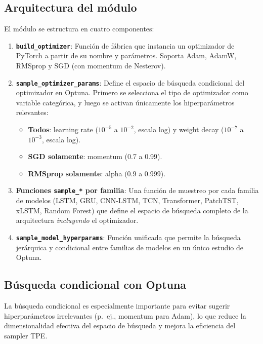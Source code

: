 \documentclass[12pt, a4paper]{article}
\newcommand{\code}[1]{\texttt{#1}}
\begin{document}
\subsection{Arquitectura del módulo}

El módulo se estructura en cuatro componentes:

\begin{enumerate}
    \item \textbf{\code{build\_optimizer}}: Función de fábrica que instancia un optimizador de PyTorch a partir de su nombre y parámetros. Soporta Adam, AdamW, RMSprop y SGD (con momentum de Nesterov).

    \item \textbf{\code{sample\_optimizer\_params}}: Define el espacio de búsqueda condicional del optimizador en Optuna. Primero se selecciona el tipo de optimizador como variable categórica, y luego se activan únicamente los hiperparámetros relevantes:
    \begin{itemize}
        \item \textbf{Todos}: learning rate ($10^{-5}$ a $10^{-2}$, escala log) y weight decay ($10^{-7}$ a $10^{-3}$, escala log).
        \item \textbf{SGD solamente}: momentum (0.7 a 0.99).
        \item \textbf{RMSprop solamente}: alpha (0.9 a 0.999).
    \end{itemize}

    \item \textbf{Funciones \code{sample\_*} por familia}: Una función de muestreo por cada familia de modelos (LSTM, GRU, CNN-LSTM, TCN, Transformer, PatchTST, xLSTM, Random Forest) que define el espacio de búsqueda completo de la arquitectura \emph{incluyendo} el optimizador.

    \item \textbf{\code{sample\_model\_hyperparams}}: Función unificada que permite la búsqueda jerárquica y condicional entre familias de modelos en un único estudio de Optuna.
\end{enumerate}

\subsection{Búsqueda condicional con Optuna}

La búsqueda condicional es especialmente importante para evitar sugerir hiperparámetros irrelevantes (p.~ej., momentum para Adam), lo que reduce la dimensionalidad efectiva del espacio de búsqueda y mejora la eficiencia del sampler TPE.
\end{document}
